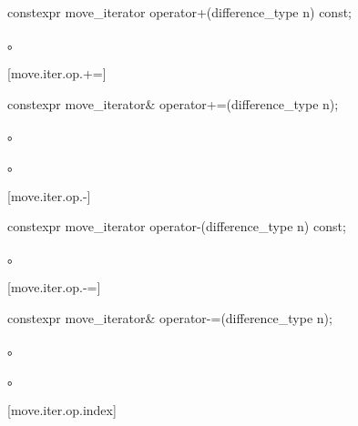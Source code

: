 %
%
\begin{itemdecl}
constexpr move_iterator operator+(difference_type n) const;
\end{itemdecl}

\begin{itemdescr}
\pnum
\returns {}。
\end{itemdescr}

[move.iter.op.+=]{}

%
%
\begin{itemdecl}
constexpr move_iterator& operator+=(difference_type n);
\end{itemdecl}

\begin{itemdescr}
\pnum
\effects {}。

\pnum
\returns {}。
\end{itemdescr}

[move.iter.op.-]{}

%
%
\begin{itemdecl}
constexpr move_iterator operator-(difference_type n) const;
\end{itemdecl}

\begin{itemdescr}
\pnum
\returns {}。
\end{itemdescr}

[move.iter.op.-=]{}

%
%
\begin{itemdecl}
constexpr move_iterator& operator-=(difference_type n);
\end{itemdecl}

\begin{itemdescr}
\pnum
\effects {}。

\pnum
\returns {}。
\end{itemdescr}

[move.iter.op.index]{}

